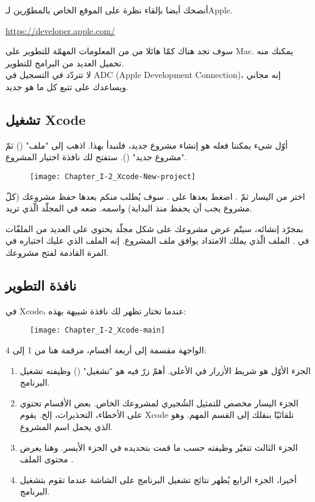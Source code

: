 أنصحك أيضا بإلقاء نظرة على الموقع الخاص بالمطوّرين لـ\textenglish{Apple}.

\url{https://developer.apple.com/}

سوف تجد هناك كمّا هائلا من من المعلومات المهمّة للتطوير على
\textenglish{Mac}.
يمكنك منه تحميل العديد من البرامج للتطوير.\\
لا تتردّد في التسجيل في
\textenglish{ADC} (\textenglish{Apple Development Connection})،
إنه مجاني ويساعدك على تتبع كل ما هو جديد.

\subsection{تشغيل \textenglish{Xcode}}

أوّل شيء يمكننا فعله هو إنشاء مشروع جديد، فلنبدأ بهذا. اذهب إلى
"ملف"
()
ثمّ
"مشروع جديد"
().
ستفتح لك نافذة اختيار المشروع.

\begin{figure}[H]
	\centering
	\texttt{[image: Chapter\_I-2\_Xcode-New-project]}
\end{figure}

اختر
من اليسار ثمّ
.
اضغط بعدها على
.
سوف يُطلب منكم بعدها حفظ مشروعك (كلّ مشروع يجب أن يحفظ منذ البداية) واسمه. ضعه في المجلّد الّذي تريد.

بمجرّد إنشائه، سيتّم عرض مشروعك على شكل مجلّد يحتوي على العديد من الملفّات في .
الملف الّذي يملك الامتداد
يوافق ملف المشروع. إنه الملف الذي عليك اختياره في المرة القادمة لفتح مشروعك.

\subsection{نافذة التطوير}

في
\textenglish{Xcode}،
عندما تختار
تظهر لك نافذة شبيهة بهذه:

\begin{figure}[H]
	\centering
	\texttt{[image: Chapter\_I-2\_Xcode-main]}
\end{figure}

الواجهة مقسمة إلى أربعة أقسام، مرقمة هنا من 1 إلى 4:

\begin{enumerate}
  \item الجزء الأوّل هو شريط الأزرار في الأعلى. أهمّ زرّ فيه هو
"تشغيل"
()
وظيفته تشغيل البرنامج.
  \item الجزء اليسار مخصص للتمثيل الشُجيري لمشروعك الخاص. بعض الأقسام تحتوي على الأخطاء، التحذيرات، إلخ. يقوم
\textenglish{Xcode}
تلقائيّا بنقلك إلى القسم المهم. وهو الذي يحمل اسم المشروع.
  \item الجزء الثالث تتغيّر وظيفته حسب ما قمت بتحديده في الجزء الأيسر. وهنا يعرض محتوى الملف
.
  \item أخيرا، الجزء الرابع يُظهر نتائج تشغيل البرنامج على الشاشة عندما تقوم بتشغيل البرنامج.
\end{enumerate}

